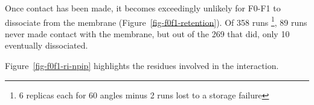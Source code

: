 \documentclass[
  letterpaper,
  DIV=11,
  numbers=noendperiod]{scrartcl}
\begin{document}
Once contact has been made, it becomes exceedingly unlikely for F0-F1 to
dissociate from the membrane (Figure~\ref{fig-f0f1-retention}). Of 358
runs \footnote{6 replicas each for 60 angles minus 2 runs lost to a
  storage failure}, 89 runs never made contact with the membrane, but
out of the 269 that did, only 10 eventually dissociated.

Figure~\ref{fig-f0f1-ri-npip} highlights the residues involved in the
interaction.

\begin{figure}

\begin{minipage}[t]{0.33\linewidth}

{\centering 


}

\subcaption{\label{fig-f0f1-unbound}~}
\end{minipage}%
%
\begin{minipage}[t]{0.33\linewidth}

{\centering 

}
\end{minipage}
\end{figure}
\end{document}
